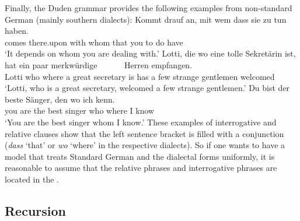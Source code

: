 Finally, the Duden grammar \citep[§1347]{Duden2005-Authors} provides the following examples from non-standard German
(mainly southern dialects):
\eal
\ex 
\gll Kommt drauf an, mit wem dass sie zu tun haben.\\
     comes there.upon \partic{} with whom that you to do have\\
\glt `It depends on whom you are dealing with.'
\zl
\eal
\ex 
\gll Lotti, die wo eine tolle Sekretärin ist, hat ein paar merkwürdige~~~~~~ Herren empfangen.\\
     Lotti  who where a great secretary is has a few strange gentlemen welcomed\\
\glt `Lotti, who is a great secretary, welcomed a few strange gentlemen.'
\ex 
\gll Du bist der beste Sänger, den wo ich kenn.\\
     you are the best singer   who where I know\\
\glt `You are the best singer whom I know.'
\zl
These examples of interrogative and relative clauses show that the left sentence bracket is filled
with a conjunction (\emph{dass} `that' or \emph{wo} `where' in the respective dialects). So if one wants to have a model that treats Standard German and the
dialectal forms uniformly, it is reasonable to assume that the relative phrases and interrogative phrases
are located in the \vf. 

\subsection{Recursion}
\label{sec-topo-rekursion}

